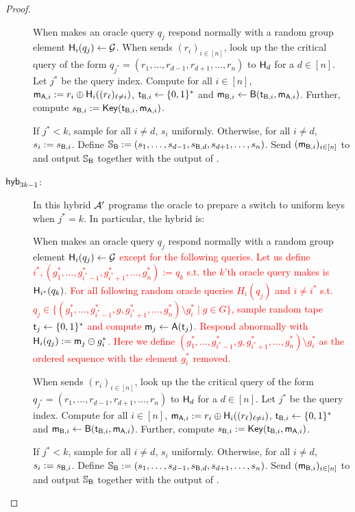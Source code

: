 \begin{proof}
\begin{description}
 When \Adv makes an oracle query $q_{j}$ respond normally with a random group element $\mathsf{H}_i(q_{j})\leftarrow\mathcal{G}$. When \Adv sends $(r_i)_{i\in[n]}$, look up the the critical query of the form $q_{j^*}= (r_1,\dots, r_{d-1},r_{d+1},\dots, r_{n})$ to $\mathsf{H}_d$ for a $d\in[n]$. Let $j^*$ be the query index. Compute for all $i\in[n]$, $\mathsf{m}_{\mathsf{A},i}:=r_i\oplus\mathsf{H}_i((r_\ell)_{\ell\neq i})$, $\mathsf{t}_{\mathsf{B},i}\leftarrow\{0,1\}^*$ and $\mathsf{m}_{\mathsf{B},i}\leftarrow\mathsf{B}(\mathsf{t}_{\mathsf{B},i},\mathsf{m}_{\mathsf{A},i})$. Further, compute $s_{\mathsf{B},i}:=\mathsf{Key}(\mathsf{t}_{\mathsf{B},i},\mathsf{m}_{\mathsf{A},i})$. 

If $j^*<k$, sample for all $i\neq d$, $s_i$ uniformly. Otherwise, for all $i\neq d$, $s_i:=s_{\mathsf{B},i}$.   Define $\mathsf{\mathbb S}_{\mathsf{B}}:=(s_{1},\dots, s_{d-1},s_{\mathsf{B},d},s_{d+1},\dots, s_{n})$.  
 Send $(\mathsf{m}_{\mathsf{B},i})_{i\in[n]}$ to \Adv and output $\mathsf{\mathbb S}_{\mathsf{B}}$ together with the output of \Adv. 
 
\item[$\mathsf{hyb}_{3k-1}$:] In this hybrid $\mathcal{A}'$ programs the oracle to prepare a switch to uniform keys when $j^*=k$. In particular, the hybrid is:

 When \Adv makes an oracle query $q_{j}$ respond normally with a random group element $\mathsf{H}_i(q_{j})\leftarrow\mathcal{G}$ \textcolor{red}{except for the following queries. Let us define $i^*, (g^*_1,\dots, g^*_{i^*-1},g^*_{i^*+1},\dots, g^*_{n}):=q_k$ s.t. the $k$'th oracle query \Adv makes is $\mathsf{H}_{i^*}(q_{k})$. 
For all following random oracle queries $H_i(q_j)$ and $i\neq i^*$ s.t. $q_j\in \{ (g^*_1,\dots, g^*_{i^*-1}, g,g^*_{i^*+1},\dots, g^*_{n}) \setminus g^*_i \mid g\in G \}$, sample random tape $\mathsf{t}_j\leftarrow\{0,1\}^*$ and compute $\mathsf{m}_{j}\leftarrow\mathsf{A}(\mathsf{t}_j)$. 
Respond abnormally with $\mathsf{H}_i(q_j):=\mathsf{m}_j\ominus g^*_{i}$. Here we define $(g^*_1,\dots, g^*_{i^*-1}, g,g^*_{i^*+1},\dots, g^*_{n}) \setminus g^*_i$ as the ordered sequence with the element $g^*_i$ removed. }

When \Adv sends $(r_i)_{i\in[n]}$, look up the the critical query of the form $q_{j^*}= (r_1,\dots, r_{d-1},r_{d+1},\dots, r_{n})$ to $\mathsf{H}_d$ for a $d\in[n]$. Let $j^*$ be the query index. Compute for all $i\in[n]$, $\mathsf{m}_{\mathsf{A},i}:=r_i\oplus\mathsf{H}_i((r_\ell)_{\ell\neq i})$, $\mathsf{t}_{\mathsf{B},i}\leftarrow\{0,1\}^*$ and $\mathsf{m}_{\mathsf{B},i}\leftarrow\mathsf{B}(\mathsf{t}_{\mathsf{B},i},\mathsf{m}_{\mathsf{A},i})$. Further, compute $s_{\mathsf{B},i}:=\mathsf{Key}(\mathsf{t}_{\mathsf{B},i},\mathsf{m}_{\mathsf{A},i})$. 

If $j^*<k$, sample for all $i\neq d$, $s_i$ uniformly. Otherwise, for all $i\neq d$, $s_i:=s_{\mathsf{B},i}$.   Define $\mathsf{\mathbb S}_{\mathsf{B}}:=(s_{1},\dots, s_{d-1},s_{\mathsf{B},d},s_{d+1},\dots, s_{n})$.  
Send $(\mathsf{m}_{\mathsf{B},i})_{i\in[n]}$ to \Adv and output $\mathsf{\mathbb S}_{\mathsf{B}}$ together with the output of \Adv. 
 

\end{description}
\end{proof}

